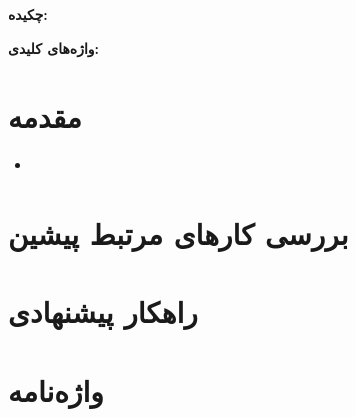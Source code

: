 \documentclass[11pt]{article}
\newcommand{\پاورقی}[1]{\footnote{\lr{#1}}}
\begin{document}



{\bf {چکیده: }}




{\bf  { واژه‌های کلیدی: }}


\setlength{\parindent}{0.25in} %

\section{مقدمه}








\begin{itemize}


\item{} 



\end{itemize}


\section{بررسی کار‌های مرتبط پیشین}








\section{راهکار پیشنهادی}








%

%


\clearpage

\section*{واژه‌نامه}
\begin{LTR}
\begin{multicols}{3}
\theendnotes 
\end{multicols}
\end{LTR}
\end{document}
